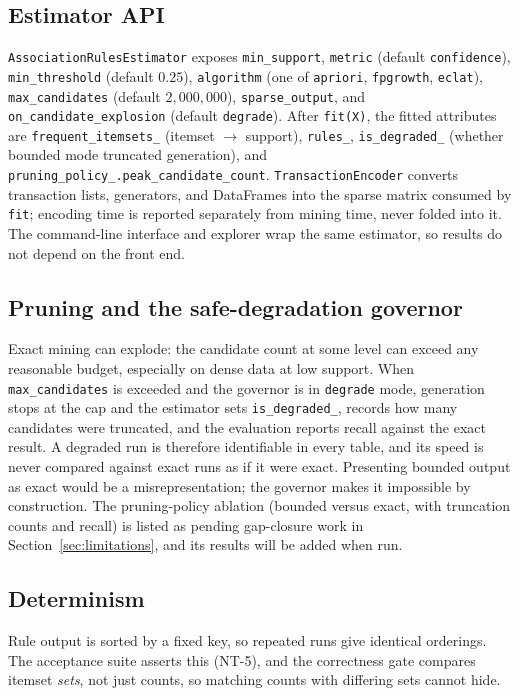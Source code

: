 \documentclass[journal,a4paper]{IEEEtran}
\begin{document}
\subsection{Estimator API}
\texttt{AssociationRulesEstimator} exposes
\texttt{min\_support}, \texttt{metric} (default \texttt{confidence}),
\texttt{min\_threshold} (default $0.25$), \texttt{algorithm} (one of
\texttt{apriori}, \texttt{fpgrowth}, \texttt{eclat}),
\texttt{max\_candidates} (default $2{,}000{,}000$),
\texttt{sparse\_output}, and \texttt{on\_candidate\_explosion}
(default \texttt{degrade}). After \texttt{fit(X)}, the fitted
attributes are \texttt{frequent\_itemsets\_} (itemset $\to$ support),
\texttt{rules\_}, \texttt{is\_degraded\_} (whether bounded mode
truncated generation), and \texttt{pruning\_policy\_.peak\_candidate\_count}.
\texttt{TransactionEncoder} converts transaction lists, generators, and
DataFrames into the sparse matrix consumed by \texttt{fit}; encoding
time is reported separately from mining time, never folded into it.
The command-line interface and explorer wrap the same estimator, so
results do not depend on the front end.

\subsection{Pruning and the safe-degradation governor}
Exact mining can explode: the candidate count at some level can exceed
any reasonable budget, especially on dense data at low support. When
\texttt{max\_candidates} is exceeded and the governor is in
\texttt{degrade} mode, generation stops at the cap and the estimator
sets \texttt{is\_degraded\_}, records how many candidates were
truncated, and the evaluation reports recall against the exact result.
A degraded run is therefore identifiable in every table, and its speed
is never compared against exact runs as if it were exact. Presenting bounded output as exact would be a misrepresentation; the
governor makes it impossible by construction. The pruning-policy ablation (bounded versus exact, with
truncation counts and recall) is listed as pending gap-closure work in
Section~\ref{sec:limitations}, and its results will be added when run.

\subsection{Determinism}
Rule output is sorted by a fixed key, so repeated runs give identical
orderings. The acceptance suite asserts this (NT-5), and the
correctness gate compares itemset \emph{sets}, not just counts, so
matching counts with differing sets cannot hide.
\end{document}
